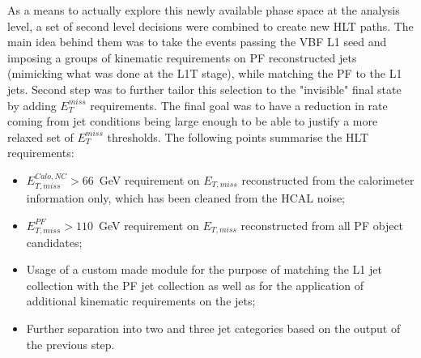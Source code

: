 \hspace{10pt} As a means to actually explore this newly available phase space at the analysis level, a set of second level decisions were combined to create new HLT paths. The main idea behind them was to take the events passing the VBF L1 seed and imposing a groups of kinematic requirements on PF reconstructed jets (mimicking what was done at the L1T stage), while matching the PF to the L1 jets. Second step was to further tailor this selection to the "invisible" final state by adding $E_{T}^{miss}$ requirements. The final goal was to have a reduction in rate coming from jet conditions being large enough to be able to justify a more relaxed set of $E_{T}^{miss}$ thresholds. The following points summarise the HLT requirements:
\begin{itemize}
    \item $E^{Calo, NC}_{T,miss}>66$~GeV requirement on $E_{T,miss}$ reconstructed from the calorimeter information only, which has been cleaned from the HCAL noise;
    \item $E^{PF}_{T,miss}>110$~GeV requirement on $E_{T,miss}$ reconstructed from all PF object candidates;
    \item Usage of a custom made module for the purpose of matching the L1 jet collection with the PF jet collection as well as for the application of additional kinematic requirements on the jets;
    \item Further separation into two and three jet categories based on the output of the previous step.
\end{itemize}

